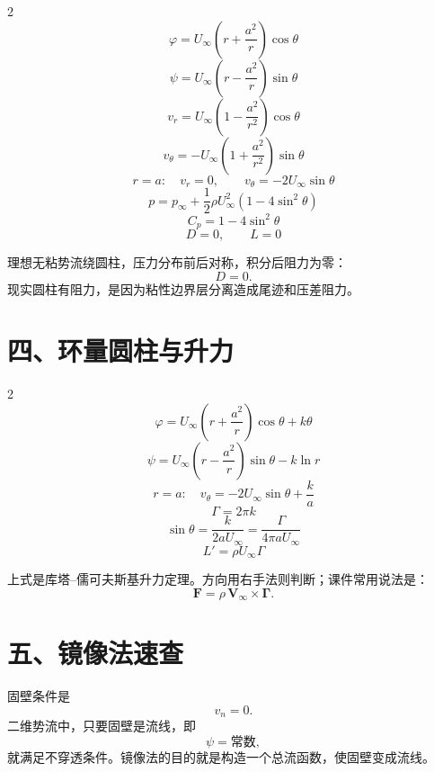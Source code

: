 \documentclass[10.5pt,a4paper]{ctexart}
\begin{document}
\begin{multicols}{2}
\[
\varphi=U_\infty\left(r+\frac{a^2}{r}\right)\cos\theta
\]
\[
\psi=U_\infty\left(r-\frac{a^2}{r}\right)\sin\theta
\]
\[
v_r=U_\infty\left(1-\frac{a^2}{r^2}\right)\cos\theta
\]
\[
v_\theta=-U_\infty\left(1+\frac{a^2}{r^2}\right)\sin\theta
\]
\[
r=a:\quad v_r=0,\qquad v_\theta=-2U_\infty\sin\theta
\]
\[
p=p_\infty+\frac12\rho U_\infty^2(1-4\sin^2\theta)
\]
\[
C_p=1-4\sin^2\theta
\]
\[
\boxed{D=0,\qquad L=0}
\]
\end{multicols}

\begin{tcolorbox}[colback=red!3,colframe=red!55!black,title=达朗贝尔佯谬]
理想无粘势流绕圆柱，压力分布前后对称，积分后阻力为零：
\[
D=0.
\]
现实圆柱有阻力，是因为粘性边界层分离造成尾迹和压差阻力。
\end{tcolorbox}

\section*{四、环量圆柱与升力}

\begin{multicols}{2}
\[
\varphi=U_\infty\left(r+\frac{a^2}{r}\right)\cos\theta+k\theta
\]
\[
\psi=U_\infty\left(r-\frac{a^2}{r}\right)\sin\theta-k\ln r
\]
\[
r=a:\quad v_\theta=-2U_\infty\sin\theta+\frac{k}{a}
\]
\[
\Gamma=2\pi k
\]
\[
\sin\theta=\frac{k}{2aU_\infty}
=\frac{\Gamma}{4\pi aU_\infty}
\]
\[
\boxed{L'=\rho U_\infty \Gamma}
\]
\end{multicols}

上式是库塔--儒可夫斯基升力定理。方向用右手法则判断；课件常用说法是：
\[
\bm F=\rho\,\bm V_\infty\times \bm\Gamma.
\]

\section*{五、镜像法速查}

\begin{tcolorbox}[colback=blue!3,colframe=blue!45!black,title=镜像法核心]
固壁条件是
\[
v_n=0.
\]
二维势流中，只要固壁是流线，即
\[
\psi=\text{常数},
\]
就满足不穿透条件。镜像法的目的就是构造一个总流函数，使固壁变成流线。
\end{tcolorbox}
\end{document}
